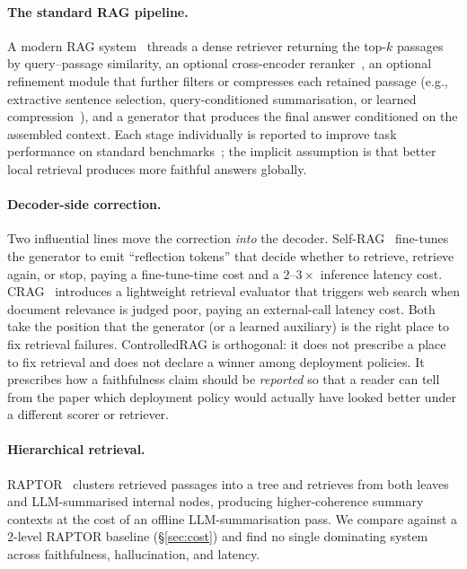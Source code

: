 \paragraph{The standard RAG pipeline.} A modern RAG
system~\citep{lewis2020rag,gao2024ragsurvey} threads a dense retriever
\citep{karpukhin2020dpr,xiong2024embedder} returning the top-$k$
passages by query--passage similarity, an optional cross-encoder
reranker~\citep{nogueira2019passage}, an optional refinement module
that further filters or compresses each retained passage
(e.g., extractive sentence selection, query-conditioned summarisation,
or learned compression~\citep{xu2024recomp}), and a generator that
produces the final answer conditioned on the assembled context. Each
stage individually is reported to improve task performance on standard
benchmarks~\citep{karpukhin2020dpr,izacard2022few,xiong2024embedder};
the implicit assumption is that better local retrieval produces more
faithful answers globally.

\paragraph{Decoder-side correction.} Two influential lines move the
correction \emph{into} the decoder.
Self-RAG~\citep{asai2024selfrag} fine-tunes the generator to emit
``reflection tokens'' that decide whether to retrieve, retrieve again,
or stop, paying a fine-tune-time cost and a $2$--$3\times$ inference
latency cost. CRAG~\citep{yan2024crag} introduces a lightweight
retrieval evaluator that triggers web search when document relevance is
judged poor, paying an external-call latency cost. Both take the
position that the generator (or a learned auxiliary) is the right place
to fix retrieval failures. ControlledRAG is orthogonal: it does not
prescribe a place to fix retrieval and does not declare a winner among
deployment policies. It prescribes how a faithfulness claim should be
\emph{reported} so that a reader can tell from the paper which
deployment policy would actually have looked better under a different
scorer or retriever.

\paragraph{Hierarchical retrieval.} RAPTOR~\citep{raptor2024} clusters
retrieved passages into a tree and retrieves from both leaves and
LLM-summarised internal nodes, producing higher-coherence summary
contexts at the cost of an offline LLM-summarisation pass. We compare
against a $2$-level RAPTOR baseline (\S\ref{sec:cost}) and find no
single dominating system across faithfulness, hallucination, and
latency.

